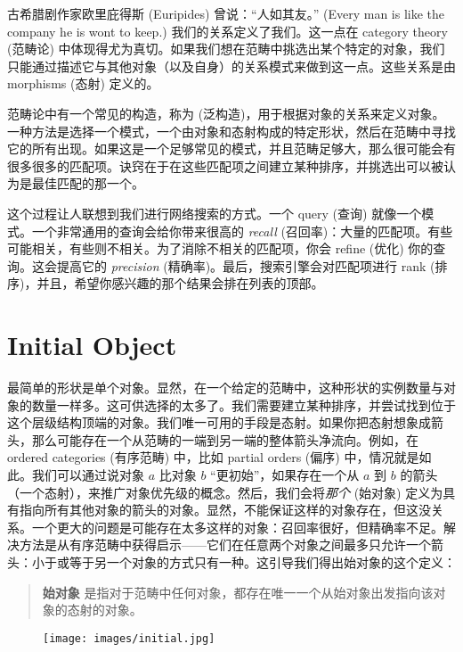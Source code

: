 
\lettrine[lhang=0.17]{古}{希腊}剧作家欧里庇得斯 (Euripides) 曾说：“人如其友。” (Every man is like the company he is wont to keep.) 我们的关系定义了我们。这一点在 category theory (范畴论) 中体现得尤为真切。如果我们想在范畴中挑选出某个特定的对象，我们只能通过描述它与其他对象（以及自身）的关系模式来做到这一点。这些关系是由 morphisms (态射) 定义的。

范畴论中有一个常见的构造，称为  (泛构造)，用于根据对象的关系来定义对象。一种方法是选择一个模式，一个由对象和态射构成的特定形状，然后在范畴中寻找它的所有出现。如果这是一个足够常见的模式，并且范畴足够大，那么很可能会有很多很多的匹配项。诀窍在于在这些匹配项之间建立某种排序，并挑选出可以被认为是最佳匹配的那一个。

这个过程让人联想到我们进行网络搜索的方式。一个 query (查询) 就像一个模式。一个非常通用的查询会给你带来很高的 \emph{recall} (召回率)：大量的匹配项。有些可能相关，有些则不相关。为了消除不相关的匹配项，你会 refine (优化) 你的查询。这会提高它的 \emph{precision} (精确率)。最后，搜索引擎会对匹配项进行 rank (排序)，并且，希望你感兴趣的那个结果会排在列表的顶部。

\section{Initial Object}

最简单的形状是单个对象。显然，在一个给定的范畴中，这种形状的实例数量与对象的数量一样多。这可供选择的太多了。我们需要建立某种排序，并尝试找到位于这个层级结构顶端的对象。我们唯一可用的手段是态射。如果你把态射想象成箭头，那么可能存在一个从范畴的一端到另一端的整体箭头净流向。例如，在 ordered categories (有序范畴) 中，比如 partial orders (偏序) 中，情况就是如此。我们可以通过说对象 $a$ 比对象 $b$ “更初始”，如果存在一个从 $a$ 到 $b$ 的箭头（一个态射），来推广对象优先级的概念。然后，我们会将\emph{那个}  (始对象) 定义为具有指向所有其他对象的箭头的对象。显然，不能保证这样的对象存在，但这没关系。一个更大的问题是可能存在太多这样的对象：召回率很好，但精确率不足。解决方法是从有序范畴中获得启示——它们在任意两个对象之间最多只允许一个箭头：小于或等于另一个对象的方式只有一种。这引导我们得出始对象的这个定义：

\begin{quote}
  \textbf{始对象} 是指对于范畴中任何对象，都存在唯一一个从始对象出发指向该对象的态射的对象。
\end{quote}

\begin{figure}[H]
  \centering
  \texttt{[image: images/initial.jpg]}
\end{figure}

